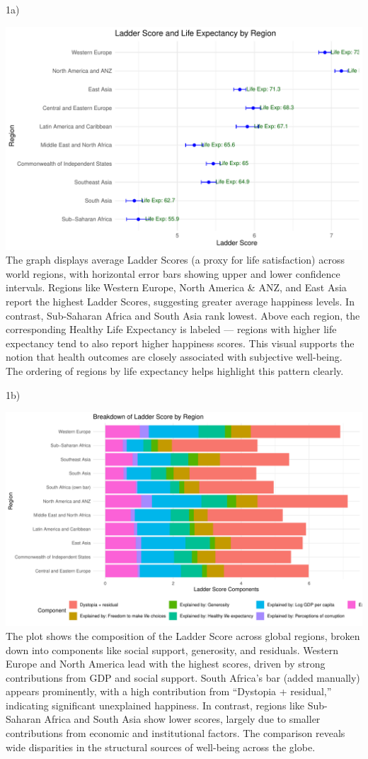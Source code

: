 \documentclass[11pt,preprint]{elsarticle}
\numberwithin{equation}{section}
\numberwithin{figure}{section}
\numberwithin{table}{section}
\begin{document}
1a)

\includegraphics{23084103_HAPPINESS_files/figure-latex/unnamed-chunk-3-1.pdf}
The graph displays average Ladder Scores (a proxy for life satisfaction)
across world regions, with horizontal error bars showing upper and lower
confidence intervals. Regions like Western Europe, North America \& ANZ,
and East Asia report the highest Ladder Scores, suggesting greater
average happiness levels. In contrast, Sub-Saharan Africa and South Asia
rank lowest. Above each region, the corresponding Healthy Life
Expectancy is labeled --- regions with higher life expectancy tend to
also report higher happiness scores. This visual supports the notion
that health outcomes are closely associated with subjective well-being.
The ordering of regions by life expectancy helps highlight this pattern
clearly.

1b)

\includegraphics{23084103_HAPPINESS_files/figure-latex/unnamed-chunk-4-1.pdf}
The plot shows the composition of the Ladder Score across global
regions, broken down into components like social support, generosity,
and residuals. Western Europe and North America lead with the highest
scores, driven by strong contributions from GDP and social support.
South Africa's bar (added manually) appears prominently, with a high
contribution from ``Dystopia + residual,'' indicating significant
unexplained happiness. In contrast, regions like Sub-Saharan Africa and
South Asia show lower scores, largely due to smaller contributions from
economic and institutional factors. The comparison reveals wide
disparities in the structural sources of well-being across the globe.
\end{document}
